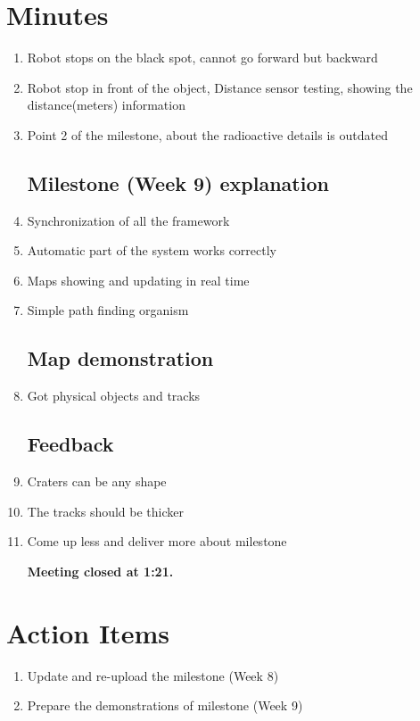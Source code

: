 \documentclass{article}
\begin{document}
\section{Minutes}
\begin{enumerate}
\subsection{Milestone (Week 8) demonstration}
\item Robot stops on the black spot, cannot go forward but backward\\
\item Robot stop in front of the object, Distance sensor testing, showing the distance(meters) information\\
\item Point 2 of the milestone, about the radioactive details is outdated

\subsection{Milestone (Week 9) explanation}
\item Synchronization of all the framework
\item Automatic part of the system works correctly
\item Maps showing and updating in real time
\item Simple path finding organism

\subsection{Map demonstration}
\item Got physical objects and tracks

\subsection{Feedback}
\item Craters can be any shape
\item The tracks should be thicker
\item Come up less and deliver more about milestone

\vspace{.5cm}
\textbf{Meeting closed at 1:21.}\\
\end{enumerate}

\section{Action Items}
\begin{enumerate}
\item Update and re-upload the milestone (Week 8)
\item Prepare the demonstrations of milestone (Week 9)
\end{enumerate}
\end{document}
